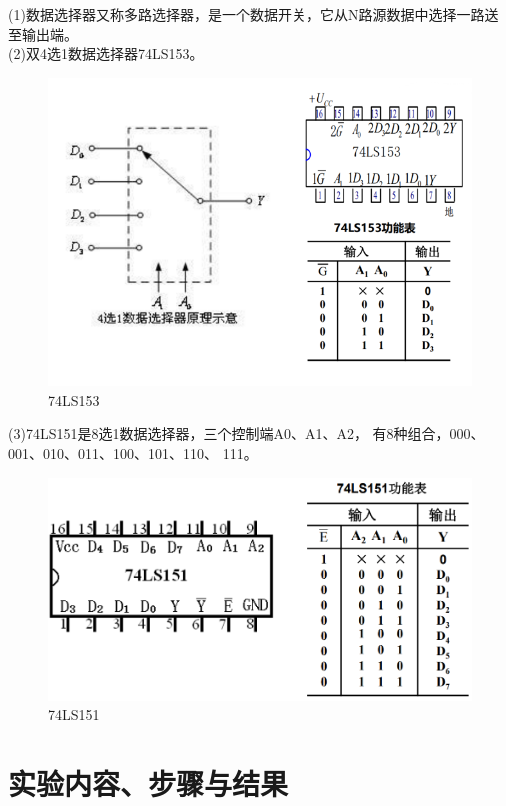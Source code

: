 \documentclass[a4paper,11pt,UTF8]{ctexart}
\begin{document}
(1)数据选择器又称多路选择器，是一个数据开关，它从N路源数据中选择一路送至输出端。
\\
(2)双4选1数据选择器74LS153。
\begin{figure}[H]
  \centering
  \includegraphics[width=12cm]{new01}
  \caption{74LS153}
  \label{fig:new01}
\end{figure}
(3)74LS151是8选1数据选择器，三个控制端A0、A1、A2，
有8种组合，000、001、010、011、100、101、110、
111。
\begin{figure}[H]
  \centering
  \includegraphics[width=14cm]{new02}
  \caption{74LS151}
  \label{fig:new01}
\end{figure}

\section{实验内容、步骤与结果}
\end{document}
